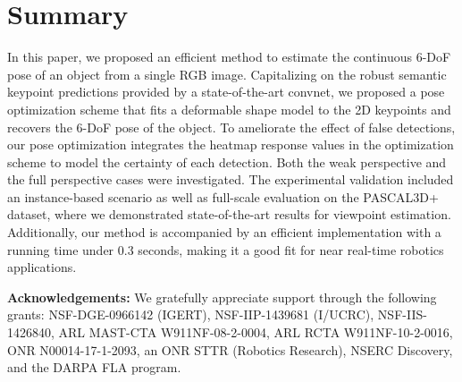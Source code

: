 \documentclass[letterpaper, 10 pt, conference]{ieeeconf}
\begin{document}
\section{Summary}
In this paper, we proposed an efficient method to estimate the continuous 6-DoF pose of an object from a single RGB image. Capitalizing on the robust semantic keypoint predictions provided by a state-of-the-art convnet, we proposed a pose optimization scheme that fits a deformable shape model to the 2D keypoints and recovers the 6-DoF pose of the object. To ameliorate the effect of false detections, our pose optimization integrates the heatmap response values in the optimization scheme to model the certainty of each detection. Both the weak perspective and the full perspective cases were investigated. The experimental validation included an instance-based scenario as well as full-scale evaluation on the PASCAL3D+ dataset, where we demonstrated state-of-the-art results for viewpoint estimation. Additionally, our method is accompanied by an efficient implementation with a running time under 0.3 seconds, making it a good fit for near real-time robotics applications.

\vspace{1em}

{\bf Acknowledgements:} We gratefully appreciate support through the following grants: NSF-DGE-0966142 (IGERT), NSF-IIP-1439681 (I/UCRC), NSF-IIS-1426840, ARL MAST-CTA W911NF-08-2-0004, ARL RCTA W911NF-10-2-0016, ONR N00014-17-1-2093, an ONR STTR (Robotics Research), NSERC Discovery, and the DARPA FLA program. 





\end{document}
